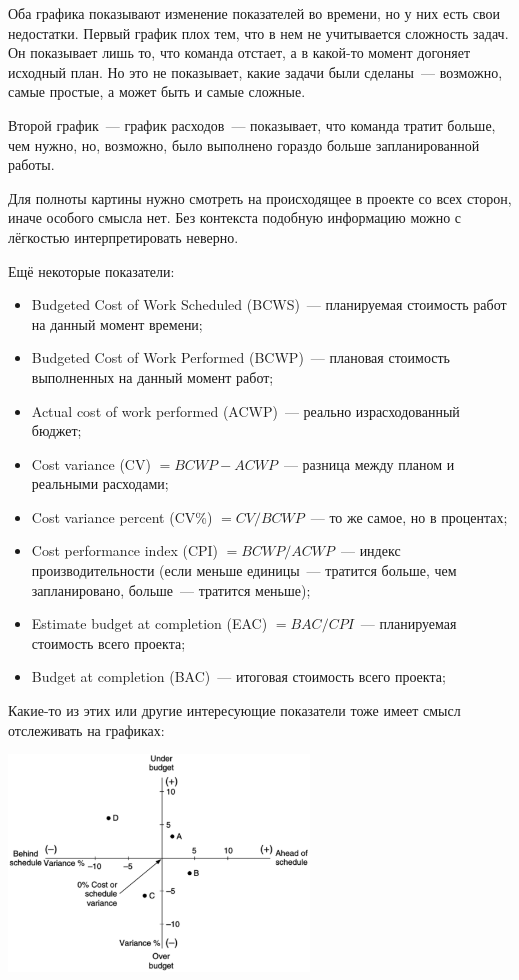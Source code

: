 \documentclass{../../text-style}
\begin{document}
Оба графика показывают изменение показателей во времени, но у них есть свои недостатки. Первый график плох тем, что в нем не учитывается сложность задач. Он показывает лишь то, что команда отстает, а в какой-то момент догоняет исходный план. Но это не показывает, какие задачи были сделаны~--- возможно, самые простые, а может быть и самые сложные.

Второй график~--- график расходов~--- показывает, что команда тратит больше, чем нужно, но, возможно, было выполнено гораздо больше запланированной работы.

Для полноты картины нужно смотреть на происходящее в проекте со всех сторон, иначе особого смысла нет. Без контекста подобную информацию можно с лёгкостью интерпретировать неверно.

Ещё некоторые показатели:

\begin{itemize}
    \item Budgeted Cost of Work Scheduled (BCWS)~--- планируемая стоимость работ на данный момент времени;
    \item Budgeted Cost of Work Performed (BCWP)~--- плановая стоимость выполненных на данный момент работ;
    \item Actual cost of work performed (ACWP)~--- реально израсходованный бюджет;
    \item Cost variance (CV) $= BCWP - ACWP$~--- разница между планом и реальными расходами;
    \item Cost variance percent (CV\%) $= CV / BCWP$~--- то же самое, но в процентах;
    \item Cost performance index (CPI) $= BCWP / ACWP$~--- индекс производительности (если меньше единицы~--- тратится больше, чем запланировано, больше~--- тратится меньше);
    \item Estimate budget at completion (EAC) $= BAC / CPI$~--- планируемая стоимость всего проекта;
    \item Budget at completion (BAC)~--- итоговая стоимость всего проекта;
\end{itemize}

Какие-то из этих или другие интересующие показатели тоже имеет смысл отслеживать на графиках:

\begin{center}
    \includegraphics[width=0.6\textwidth]{varianceGraph.png}
\end{center}
\end{document}
